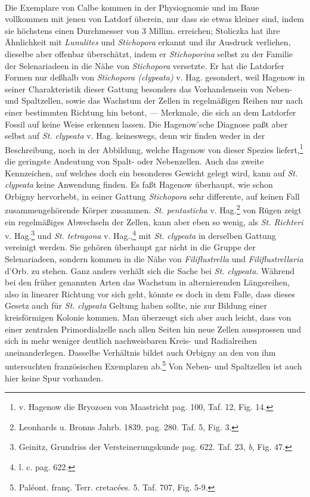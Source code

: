\documentclass[a4paper, 11pt, oneside, german]{article}
\begin{document}
\paragraph{}
Die Exemplare von Calbe kommen in der Physiognomie und im Baue vollkommen mit jenen von Latdorf überein, nur dass sie etwas kleiner sind, indem sie höchstens einen Durchmesser von 3 Millim. erreichen; Stoliczka hat ihre Ähnlichkeit mit \emph{Lunulites} und \emph{Stichopora} erkannt und ihr Ausdruck verliehen, dieselbe aber offenbar überschätzt, indem er \emph{Stichoporina} selbst zu der Familie der Selenariadeen in die Nähe von \emph{Stichopora} versetzte. Er hat die Latdorfer Formen nur deßhalb von \emph{Stichopora (clypeata)} v. Hag. gesondert, weil Hagenow in seiner Charakteristik dieser Gattung besonders das Vorhandensein von Neben- und Spaltzellen, sowie das Wachstum der Zellen in regelmäßigen Reihen nur nach einer bestimmten Richtung hin betont, --- Merkmale, die sich an dem Latdorfer Fossil auf keine Weise erkennen lassen. Die Hagenow'sche Diagnose paßt aber selbst auf \emph{St. clypeata} v. Hag. keineswegs, denn wir finden weder in der Beschreibung, noch in der Abbildung, welche Hagenow von dieser Spezies liefert,\footnote{v. Hagenow die Bryozoen von Maastricht pag. 100, Taf. 12, Fig. 14.} die geringste Andeutung von Spalt- oder Nebenzellen. Auch das zweite Kennzeichen, auf welches doch ein besonderes Gewicht gelegt wird, kann auf \emph{St. clypeata} keine Anwendung finden. Es faßt Hagenow überhaupt, wie schon Orbigny hervorhebt, in seiner Gattung \emph{Stichopora} sehr differente, auf keinen Fall zusammengehörende Körper zusammen. \emph{St. pentasticha} v. Hag.\footnote{Leonhards u. Bronns Jahrb. 1839. pag. 280. Taf. 5, Fig. 3.} von Rügen zeigt ein regelmäßiges Abwechseln der Zellen, kann aber eben so wenig, als \emph{St. Richteri} v. Hag.\footnote{Geinitz, Grundriss der Versteinerungskunde pag. 622. Taf. 23, \emph{b}, Fig. 47.} und \emph{St. tetragona} v. Hag.,\footnote{l. c. pag. 622.} mit \emph{St. clypeata} in derselben Gattung vereinigt werden. Sie gehören überhaupt gar nicht in die Gruppe der Selenariadeen, sondern kommen in die Nähe von \emph{Filiflustrella} und \emph{Filiflustrellaria} d'Orb. zu stehen. Ganz anders verhält sich die Sache bei \emph{St. clypeata}. Während bei den früher genannten Arten das Wachstum in alternierenden Längsreihen, also in linearer Richtung vor sich geht, könnte es doch in dem Falle, dass dieses Gesetz auch für \emph{St. clypeata} Geltung haben sollte, nie zur Bildung einer kreisförmigen Kolonie kommen. Man überzeugt sich aber auch leicht, dass von einer zentralen Primordialzelle nach allen Seiten hin neue Zellen aussprossen und sich in mehr weniger deutlich nachweisbaren Kreis- und Radialreihen aneinanderlegen. Dasselbe Verhältnis bildet auch Orbigny an den von ihm untersuchten französischen Exemplaren ab.\footnote{Paléont. franç. Terr. cretacées. 5. Taf. 707, Fig. 5-9.} Von Neben- und Spaltzellen ist auch hier keine Spur vorhanden.
\end{document}

